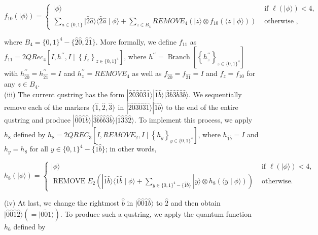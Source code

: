 \documentclass[10pt]{article}
\begin{document}
$$
f_{10}(|\phi\rangle)= \begin{cases}|\phi\rangle & \text { if } \ell(|\phi\rangle)<4, \\ \sum_{a \in\{0,1\}}|\hat{2} \hat{a}\rangle\langle\hat{2} \hat{a} \mid \phi\rangle+\sum_{z \in B_{4}} R E M O V E_{4}\left(|z\rangle \otimes f_{10}(\langle z \mid \phi\rangle)\right) & \text { otherwise },\end{cases}
$$

where $B_{4}=\{0,1\}^{4}-\{\hat{2} \hat{0}, \hat{2} \hat{1}\}$. More formally, we define $f_{11}$ as $f_{11}=2 Q R e c_{4}\left[I, h^{\prime \prime}, I \mid\left\{f_{z}\right\}_{z \in\{0,1\}^{4}}\right]$, where $h^{\prime \prime}=\operatorname{Branch}\left[\left\{h_{z}^{\prime \prime}\right\}_{z \in\{0,1\}^{4}}\right]$ with $h_{\hat{2} \hat{0}}^{\prime \prime}=h_{\hat{2} \hat{1}}^{\prime \prime}=I$ and $h_{z}^{\prime \prime}=R E M O V E_{4}$ as well as $f_{\hat{2} \hat{0}}=f_{\hat{2} \hat{1}}=I$ and $f_{z}=f_{10}$ for any $z \in B_{4}$.\\
(iii) The current qustring has the form $|\hat{2} \hat{0} \hat{3} \hat{0} \hat{3} \hat{1}\rangle|\hat{1} \hat{b}\rangle|\hat{3} \hat{b} \hat{3} \hat{b} \hat{3} \hat{b}\rangle$. We sequentially remove each of the markers $\{\hat{1}, \hat{2}, \hat{3}\}$ in $|\hat{2} \hat{0} \hat{3} \hat{0} \hat{3} \hat{1}\rangle|\hat{1} \hat{b}\rangle$ to the end of the entire qustring and produce $|\hat{0} \hat{0} \hat{1} \hat{b}\rangle|\hat{3} \hat{b} \hat{b} \hat{b} \hat{3} \hat{b}\rangle|\hat{1} \hat{3} \hat{3} \hat{2}\rangle$. To implement this process, we apply $h_{8}$ defined by $h_{8}=2 Q R E C_{3}\left[I, R E M O V E_{2}, I \mid\left\{h_{y}\right\}_{y \in\{0,1\}^{4}}\right]$, where $h_{\hat{1} \hat{b}}=I$ and $h_{y}=h_{8}$ for all $y \in\{0,1\}^{4}-\{\hat{1} \hat{b}\}$; in other words,

$$
h_{8}(|\phi\rangle)= \begin{cases}|\phi\rangle & \text { if } \ell(|\phi\rangle)<4, \\ \operatorname{REMOVE} E_{2}\left(|\hat{1} \hat{b}\rangle\langle\hat{1} \hat{b} \mid \phi\rangle+\sum_{y \in\{0,1\}^{4}-\{\hat{1} \hat{b}\}}|y\rangle \otimes h_{8}(\langle y \mid \phi\rangle)\right) & \text { otherwise. }\end{cases}
$$

(iv) At last, we change the rightmost $\hat{b}$ in $|\hat{0} \hat{0} \hat{1} \hat{b}\rangle$ to $\hat{2}$ and then obtain $|\hat{0} \hat{0} \hat{1} \hat{2}\rangle(=|\widetilde{001}\rangle)$. To produce such a qustring, we apply the quantum function $h_{6}$ defined by
\end{document}
